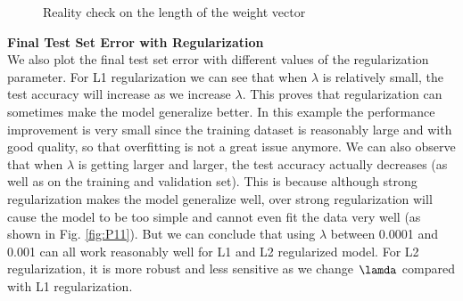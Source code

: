 \documentclass{article} %
\begin{document}
\begin{figure}%
	\centering
	\qquad
	\caption{Reality check on the length of the weight vector}%
	\label{fig:P4}%
\end{figure}

\textbf{Final Test Set Error with Regularization}\\
We also plot the final test set error with different values of the regularization parameter. For L1 regularization we can see that when $\lambda$ is relatively small, the test accuracy will increase as we increase $\lambda$. This proves that regularization can sometimes make the model generalize better. In this example the performance improvement is very small since the training dataset is reasonably large and with good quality, so that overfitting is not a great issue anymore. We can also observe that when $\lambda$ is getting larger and larger, the test accuracy actually decreases (as well as on the training and validation set). This is because although strong regularization makes the model generalize well, over strong regularization will cause the model to be too simple and cannot even fit the data very well (as shown in Fig. \ref{fig:P11}). But we can conclude that using $\lambda$ between 0.0001 and 0.001 can all work reasonably well for L1 and L2 regularized model. For L2 regularization, it is more robust and less sensitive as we change $\lamda$ compared with L1 regularization.
\end{document}
